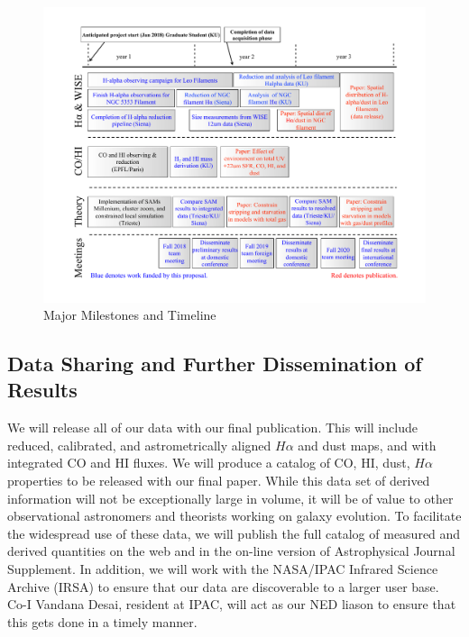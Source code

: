 \documentclass[11pt, preprint]{aastex}
\begin{document}
{\begin{figure}[hb!]
\vspace*{-.4cm}
\includegraphics[width=1.1\textwidth]{work-plan2.pdf}
\vspace{-1.5cm}
\caption{Major Milestones and Timeline}
\label{fig:workplan}
\end{figure}

\vspace*{-.8cm}\subsection{Data Sharing and Further Dissemination of Results }
\vspace*{-.3cm}

We will release all of our data with our final publication.  This will include 
reduced, calibrated, and astrometrically aligned
$H\alpha$ and dust maps, and with integrated CO and HI fluxes.
We will produce a catalog of CO, HI, dust, $H\alpha$
properties to be released with our final paper.
While this data set of derived information will not be exceptionally
large in volume, it will be of value to other observational
astronomers and theorists working on galaxy evolution. To facilitate
the widespread use of these data, we will publish the full catalog of
measured and derived quantities on the web and in the on-line version
of Astrophysical Journal Supplement. In addition, we will work with
the NASA/IPAC Infrared Science Archive (IRSA) to ensure that our data are
discoverable to a larger user base. Co-I Vandana Desai, resident at
IPAC, will act as our NED liason to ensure that this gets done in a
timely manner.

}
\end{document}
